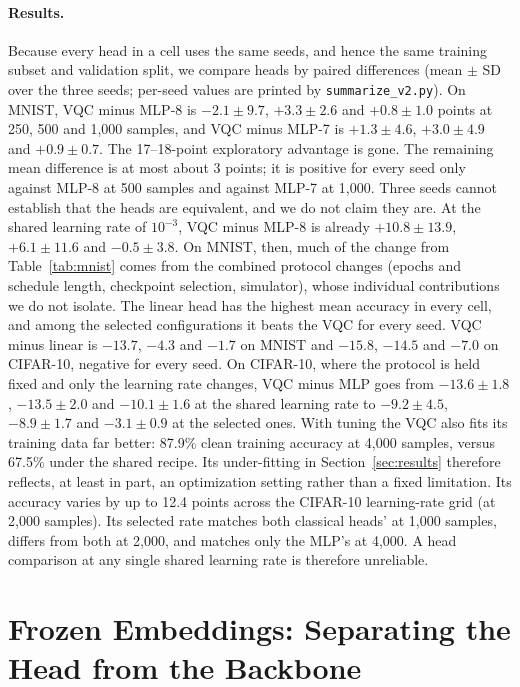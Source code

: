 \documentclass[10pt]{article}
\begin{document}
\paragraph{Results.}
Because every head in a cell uses the same seeds, and hence the same training
subset and validation split, we compare heads by paired differences (mean
$\pm$ SD over the three seeds; per-seed values are printed by
\texttt{summarize\_v2.py}). On MNIST, VQC minus MLP-8 is $-2.1 \pm 9.7$,
$+3.3 \pm 2.6$ and $+0.8 \pm 1.0$ points at 250, 500 and 1{,}000 samples, and
VQC minus MLP-7 is $+1.3 \pm 4.6$, $+3.0 \pm 4.9$ and $+0.9 \pm 0.7$. The
17--18-point exploratory advantage is gone. The remaining mean difference is
at most about 3 points; it is positive for every seed only against MLP-8 at 500 samples and
against MLP-7 at 1{,}000. Three seeds cannot establish that the heads are
equivalent, and we do not claim they are. At the shared learning rate of
$10^{-3}$, VQC minus MLP-8 is already $+10.8 \pm 13.9$, $+6.1 \pm 11.6$ and
$-0.5 \pm 3.8$. On MNIST, then, much of the change from Table~\ref{tab:mnist}
comes from the combined protocol changes (epochs and schedule length, checkpoint
selection, simulator), whose individual contributions we do not isolate. The
linear head has the highest mean accuracy in every cell, and among the selected
configurations it beats the VQC for every seed. VQC minus linear is $-13.7$, $-4.3$ and $-1.7$
on MNIST and $-15.8$, $-14.5$ and $-7.0$ on CIFAR-10, negative for every seed.
On CIFAR-10, where the protocol is held fixed and only the learning rate
changes, VQC minus MLP goes from $-13.6 \pm 1.8$, $-13.5 \pm 2.0$ and
$-10.1 \pm 1.6$ at the shared learning rate to $-9.2 \pm 4.5$, $-8.9 \pm 1.7$
and $-3.1 \pm 0.9$ at the selected ones. With tuning the VQC also fits its
training data far better: 87.9\% clean training accuracy at 4{,}000 samples,
versus 67.5\% under the shared recipe. Its under-fitting in
Section~\ref{sec:results} therefore reflects, at least in part, an optimization
setting rather than a fixed limitation. Its accuracy varies by up to 12.4 points
across the CIFAR-10 learning-rate grid (at 2{,}000 samples). Its selected rate
matches both classical heads' at 1{,}000 samples, differs from both at 2{,}000,
and matches only the MLP's at 4{,}000. A head comparison at any single shared
learning rate is therefore unreliable.

\section{Frozen Embeddings: Separating the Head from the Backbone}
\label{sec:frozen}
\end{document}
